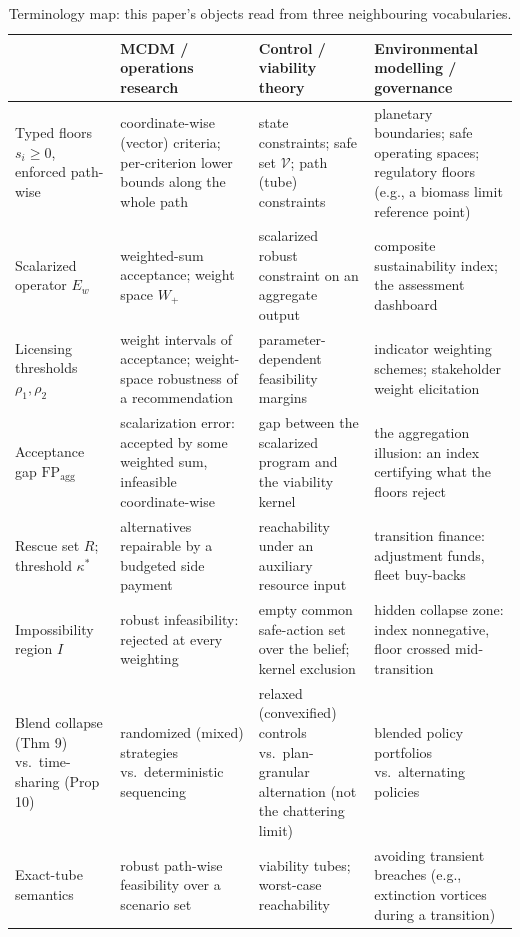 \documentclass[3p,11pt]{elsarticle}
\begin{document}
\begin{table}[htbp]
\centering
\small
\caption{Terminology map: this paper's objects read from three neighbouring
vocabularies.}
\label{tab:translation}
\begin{tabular}{@{}p{2.55cm}p{3.85cm}p{3.55cm}p{4.55cm}@{}}
\toprule
 & \textbf{MCDM / operations research} & \textbf{Control / viability theory} & \textbf{Environmental modelling / governance} \\
\midrule
Typed floors \(s_i \ge 0\), enforced path-wise &
coordinate-wise (vector) criteria; per-criterion lower bounds along the whole path &
state constraints; safe set \(\mathcal{V}\); path (tube) constraints &
planetary boundaries; safe operating spaces; regulatory floors (e.g., a biomass limit reference point) \\
\addlinespace
Scalarized operator \(E_w\) &
weighted-sum acceptance; weight space \(W_+\) &
scalarized robust constraint on an aggregate output &
composite sustainability index; the assessment dashboard \\
\addlinespace
Licensing thresholds \(\rho_1, \rho_2\) &
weight intervals of acceptance; weight-space robustness of a recommendation &
parameter-dependent feasibility margins &
indicator weighting schemes; stakeholder weight elicitation \\
\addlinespace
Acceptance gap \(\mathrm{FP}_{\mathrm{agg}}\) &
scalarization error: accepted by some weighted sum, infeasible coordinate-wise &
gap between the scalarized program and the viability kernel &
the aggregation illusion: an index certifying what the floors reject \\
\addlinespace
Rescue set \(R\); threshold \(\kappa^*\) &
alternatives repairable by a budgeted side payment &
reachability under an auxiliary resource input &
transition finance: adjustment funds, fleet buy-backs \\
\addlinespace
Impossibility region \(I\) &
robust infeasibility: rejected at every weighting &
empty common safe-action set over the belief; kernel exclusion &
hidden collapse zone: index nonnegative, floor crossed mid-transition \\
\addlinespace
Blend collapse (Thm 9) vs.\ time-sharing (Prop 10) &
randomized (mixed) strategies vs.\ deterministic sequencing &
relaxed (convexified) controls vs.\ plan-granular alternation (not the
chattering limit) &
blended policy portfolios vs.\ alternating policies \\
\addlinespace
Exact-tube semantics &
robust path-wise feasibility over a scenario set &
viability tubes; worst-case reachability &
avoiding transient breaches (e.g., extinction vortices during a transition) \\
\bottomrule
\end{tabular}
\end{table}
\end{document}
